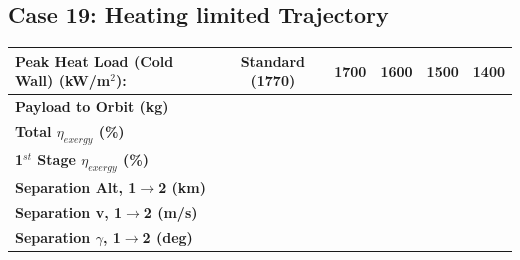 \subsection{Case 19: Heating limited Trajectory}
\begin{table}[ht]
	
	\centering
	\begin{tabular}{l c c c c c } 
		\hline \textbf{Peak Heat Load (Cold Wall)} (kW/m$^2$):
		& Standard (1770)
		& 1700
		& 1600
		& 1500
		& 1400
		\\
		\hline \textbf{Payload to Orbit (kg)}
		& \textbf{\PayloadToOrbitheatLimStandard}
		& \textbf{\PayloadToOrbitheatLimSeventeenHundred}
		& \textbf{\PayloadToOrbitheatLimSixteenHundred}
		& \textbf{\PayloadToOrbitheatLimFifteenHundred}
		& \textbf{\PayloadToOrbitheatLimFourteenHundred}
		\\
		\textbf{Total $\eta_{exergy}$ (\%)}
		& \textbf{\totalExergyEffheatLimStandard}
		& \textbf{\totalExergyEffheatLimSeventeenHundred}
		& \textbf{\totalExergyEffheatLimSixteenHundred}
		& \textbf{\totalExergyEffheatLimFifteenHundred}
		& \textbf{\totalExergyEffheatLimFourteenHundred}
		\\
		\hline 
		\textbf{1$^{st}$ Stage $\eta_{exergy}$ (\%)}
		& \textbf{\firstExergyEffheatLimStandard}
		& \textbf{\firstExergyEffheatLimSeventeenHundred}
		& \textbf{\firstExergyEffheatLimSixteenHundred}
		& \textbf{\firstExergyEffheatLimFifteenHundred}
		& \textbf{\firstExergyEffheatLimFourteenHundred}
		\\
		\textbf{Separation Alt, 1$\rightarrow$2 (km)}
		& \firstsecondSeparationAltheatLimStandard
		& \firstsecondSeparationAltheatLimSeventeenHundred
		& \firstsecondSeparationAltheatLimSixteenHundred
		& \firstsecondSeparationAltheatLimFifteenHundred
		& \firstsecondSeparationAltheatLimFourteenHundred
		\\
		\textbf{Separation v, 1$\rightarrow$2 (m/s)}
		& \firstsecondSeparationvheatLimStandard
		& \firstsecondSeparationvheatLimSeventeenHundred
		& \firstsecondSeparationvheatLimSixteenHundred
		& \firstsecondSeparationvheatLimFifteenHundred
		& \firstsecondSeparationvheatLimFourteenHundred
		\\
		\textbf{Separation $\gamma$, 1$\rightarrow$2 (deg)}
		& \firstsecondSeparationgammaheatLimStandard
		& \firstsecondSeparationgammaheatLimSeventeenHundred
		& \firstsecondSeparationgammaheatLimSixteenHundred
		& \firstsecondSeparationgammaheatLimFifteenHundred
		& \firstsecondSeparationgammaheatLimFourteenHundred
		\\

\end{tabular}
\end{table}
